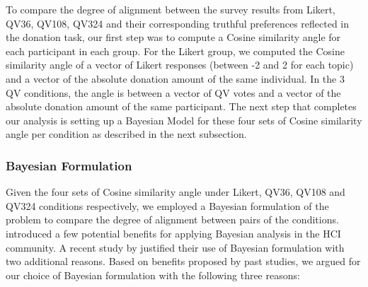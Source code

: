 To compare the degree of alignment between the survey results from Likert, QV36, QV108, QV324 and their corresponding truthful preferences reflected in the donation task, our first step was to compute a Cosine similarity angle for each participant in each group. For the Likert group, we computed the Cosine similarity angle of a vector of Likert responses (between -2 and 2 for each topic) and a vector of the absolute donation amount of the same individual. In the 3 QV conditions, the angle is between a vector of QV votes and a vector of the absolute donation amount of the same participant. The next step that completes our analysis is setting up a Bayesian Model for these four sets of Cosine similarity angle per condition as described in the next subsection.


\subsubsection{Bayesian Formulation}

Given the four sets of Cosine similarity angle under Likert, QV36, QV108 and QV324 conditions respectively, we employed a Bayesian formulation of the problem to compare the degree of alignment between pairs of the conditions. \textcite{kay2016researcher} introduced a few potential benefits for applying Bayesian analysis in the HCI community. A recent study by \textcite{xiao2019should} justified their use of Bayesian formulation with two additional reasons. Based on benefits proposed by past studies, we argued for our choice of Bayesian formulation with the following three reasons:

